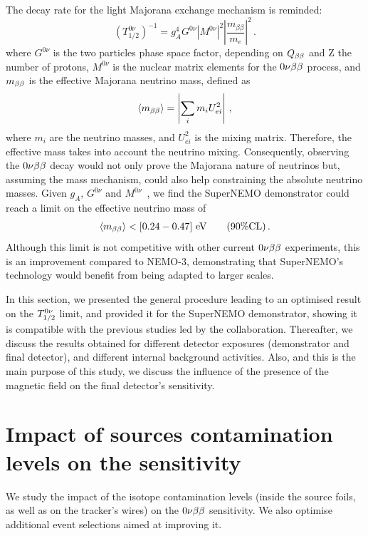 The decay rate for the light Majorana exchange mechanism is reminded:
\begin{equation}
  (T_{1/2}^{0\nu})^{-1} = g_{A}^{4}G^{0\nu}|M^{0\nu}|^{2}\left\lvert\dfrac{m_{\beta\beta}}{m_{e}}\right\rvert^{2}\,.
\end{equation}
where $G^{0\nu}$ is the two particles phase space factor, depending on $Q_{\beta\beta}$ and Z the number of protons, $M^{0\nu}$ is the nuclear matrix elements for the $0\nu\beta\beta$ process, and $m_{\beta\beta}$ is the effective Majorana neutrino mass, defined as
\begin{equation}
  \langle m_{\beta\beta} \rangle = \left\vert \sum_{i}m_{i}U^{2}_{ei} \right\vert \,,
\end{equation}
where $m_{i}$ are the neutrino masses, and $U^{2}_{ei}$ is the mixing matrix.
Therefore, the effective mass takes into account the neutrino mixing.
Consequently, observing the $0\nu\beta\beta$ decay would not only prove the Majorana nature of neutrinos but, assuming the mass mechanism, could also help constraining the absolute neutrino masses.
Given $g_{A}$, $G^{0\nu}$ and $M^{0\nu}$~\cite{PhysRevC.85.034316,PhysRevC.83.034320}, we find the SuperNEMO demonstrator could reach a limit on the effective neutrino mass of
\begin{equation}
\langle m_{\beta\beta}\rangle < [0.24-0.47]~\text{eV}\qquad (90\% \text{CL})\,.
\end{equation}
Although this limit is not competitive with other current $0\nu\beta\beta$ experiments, this is an improvement compared to NEMO-$3$, demonstrating that SuperNEMO's technology would benefit from being adapted to larger scales.

In this section, we presented the general procedure leading to an optimised result on the $T_{1/2}^{0\nu}$ limit, and provided it for the SuperNEMO demonstrator, showing it is compatible with the previous studies led by the collaboration.
Thereafter, we discuss the results obtained for different detector exposures (demonstrator and final detector), and different internal background activities.
Also, and this is the main purpose of this study, we discuss the influence of the presence of the magnetic field on the final detector's sensitivity.


\section{Impact of sources contamination levels on the sensitivity}
\label{sec:demonstrator_sensitivity}

We study the impact of the isotope contamination levels (inside the source foils, as well as on the tracker's wires) on the $0\nu\beta\beta$ sensitivity.
We also optimise additional event selections aimed at improving it.


